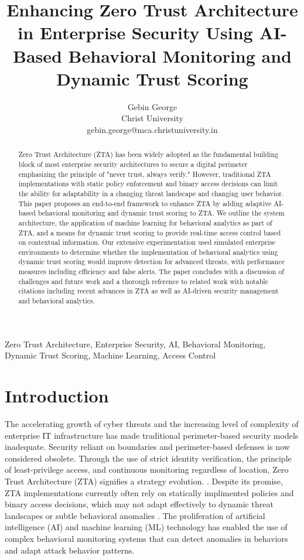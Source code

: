 \documentclass[conference]{IEEEtran}
\title{Enhancing Zero Trust Architecture in Enterprise Security Using AI-Based Behavioral Monitoring and Dynamic Trust Scoring}
\author{Gebin George\\Christ University\\gebin.george@mca.christuniversity.in}
\begin{document}
\maketitle

\begin{abstract}
Zero Trust Architecture (ZTA) has been widely adopted as the fundamental building block of most enterprise security architectures to secure a digital perimeter emphasizing the principle of "never trust, always verify." However, traditional ZTA implementations with static policy enforcement and binary access decisions can limit the ability for adaptability in a changing threat landscape and changing user behavior. This paper proposes an end-to-end framework to enhance ZTA by adding adaptive AI-based behavioral monitoring and dynamic trust scoring to ZTA. We outline the system architecture, the application of machine learning for behavioral analytics as part of ZTA, and a means for dynamic trust scoring to provide real-time access control based on contextual information. Our extensive experimentation used simulated enterprise environments to determine whether the implementation of behavioral analytics using dynamic trust scoring would improve detection for advanced threats, with performance measures including efficiency and false alerts. The paper concludes with a discussion of challenges and future work and a thorough reference to related work with notable citations including recent advances in ZTA as well as AI-driven security management and behavioral analytics.\end{abstract}

\begin{IEEEkeywords}
Zero Trust Architecture, Enterprise Security, AI, Behavioral Monitoring, Dynamic Trust Scoring, Machine Learning, Access Control
\end{IEEEkeywords}

\section{Introduction}
The accelerating growth of cyber threats and the increasing level of complexity of enterprise IT infrastructure has made traditional perimeter-based security models inadequate. Security reliant on boundaries and perimeter-based defenses is now considered obsolete. Through the use of strict identity verification, the principle of least-privilege access, and continuous monitoring regardless of location, Zero Trust Architecture (ZTA) signifies a strategy evolution. \cite{paper1}. Despite its promise, ZTA implementations currently often rely on statically implimented policies and binary access decisions, which may not adapt effectively to dynamic threat landscapes or subtle behavioral anomalies \cite{paper2,paper3}. The proliferation of artificial intelligence (AI) and machine learning (ML) technology has enabled the use of complex behavioral monitoring systems that can detect anomalies in behaviors and adapt attack behavior patterns\cite{paper4,paper5}.
\end{document}
